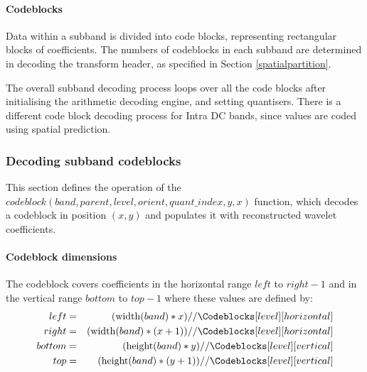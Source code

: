 \paragraph{Codeblocks\newline}

Data within a subband is divided into code blocks,
representing rectangular blocks of coefficients. The numbers of codeblocks
in each subband are determined in decoding the transform header, as specified
in Section \ref{spatialpartition}.

The overall subband decoding process loops over all the code blocks after initialising the
arithmetic decoding engine, and setting quantisers. There is a different code block decoding
process for Intra DC bands, since values are coded using spatial prediction.

\begin{pseudo*}
\bsELSE
\bsEND
{}
    \bsEND
\bsEND

\bsEND
{}
\end{pseudo*}

\subsubsection{Decoding subband codeblocks}

\label{codeblocks}

This section defines the operation of the 
$codeblock(band,parent,level, orient,quant\_index,y,x)$ function, which decodes a 
codeblock in position $(x,y)$ and populates it with reconstructed 
wavelet coefficients.

\begin{comment}
[Include a figure here]
\end{comment}

\paragraph{Codeblock dimensions\newline}

The codeblock covers coefficients in the horizontal range $left$ to $right-1$ and in the vertical
range $bottom$ to $top-1$ where these values are defined by:
\begin{eqnarray*}
  left & = & (\width(band)*x)//\Codeblocks[level][horizontal] \\
  right & = & (\width(band)*(x+1))//\Codeblocks[level][horizontal] \\
  bottom & = & (\height(band)*y)//\Codeblocks[level][vertical] \\
  top & = & (\height(band)*(y+1))//\Codeblocks[level][vertical]
\end{eqnarray*}

